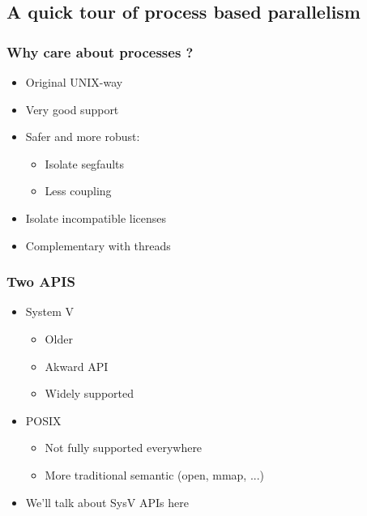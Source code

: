\subsection{A quick tour of process based parallelism}
\label{subsec:sysv}


\begin{frame}
  \frametitle{Why care about processes ?}

  \begin{itemize}
  \item Original UNIX-way
  \item Very good support
  \item Safer and more robust:
    \begin{itemize}
    \item Isolate segfaults
    \item Less coupling
    \end{itemize}
  \item Isolate incompatible licenses
  \item Complementary with threads
  \end{itemize}
\end{frame}


\begin{frame}
  \frametitle{Two APIS}

  \begin{itemize}
  \item System V
    \begin{itemize}
    \item Older
    \item Akward API
    \item Widely supported
    \end{itemize}
  \item POSIX
    \begin{itemize}
    \item Not fully supported everywhere
    \item More traditional semantic (open, mmap, ...)
    \end{itemize}
  \item We'll talk about SysV APIs here
  \end{itemize}
\end{frame}

